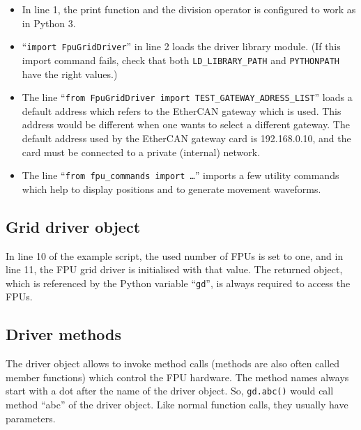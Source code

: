 \documentclass[11pt,a4paper]{report}
\begin{document}
\begin{itemize}
\item In line 1, the print function and the division operator is
  configured to work as in Python 3.
  
\item ``\texttt{import FpuGridDriver}'' in line 2 loads the driver
  library module. (If this import command fails, check that both
  \verb+LD_LIBRARY_PATH+ and \verb+PYTHONPATH+ have the right values.)

\item The line ``\texttt{from FpuGridDriver import
  TEST\_GATEWAY\_ADRESS\_LIST}'' loads a default address which refers to
  the EtherCAN gateway which is used. This address would be different
  when one wants to select a different gateway. The default
  address used by the EtherCAN gateway card is 192.168.0.10,
  and the card must be connected to a private (internal) network.

\item The line ``\texttt{from fpu\_commands import \ldots}'' imports a
  few utility commands which help to display positions and to generate
  movement waveforms.

 
\end{itemize}

\subsection{Grid driver object}

In line 10 of the example script, the used number of FPUs is set to
one, and in line 11, the FPU grid driver is initialised with that
value. The returned object, which is referenced by the Python variable
``\texttt{gd}'', is always required to access the FPUs.

\subsection{Driver methods}
The driver object allows to invoke method calls (methods are also
often called member functions) which control the FPU hardware. The
method names always start with a dot after the name of the driver
object.  So, \texttt{gd.abc()} would call method ``abc'' of the driver
object. Like normal function calls, they usually have parameters.
\end{document}
